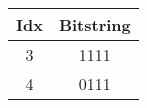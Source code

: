 \documentclass{standalone}
\begin{document}
	\begin{tabular}{cc}
		\toprule
		Idx & Bitstring \\
		\midrule
		\rowcolor{CBThree}
		3 & 1111 \\
		\rowcolor{CBFour}
		4 & 0111 \\
		\bottomrule
	\end{tabular}
\end{document}
